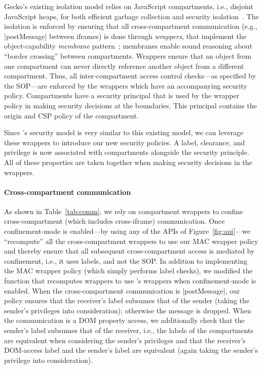 Gecko's existing isolation model relies on JavaScript compartments, i.e.,
disjoint JavaScript heaps, for both efficient garbage collection and
security isolation~\cite{wagner2011compartmental}.
%
The isolation is enforced by ensuring that all cross-compartment
communication (e.g., \js|postMessage| between iframes) is done through
\emph{wrappers}, that implement the object-capability \emph{membrane}
pattern~\cite{miller2003paradigm,miller2006robust}; membranes enable
sound reasoning about ``border crossing'' between compartments. 
%
Wrappers ensure that an object from one compartment can
never directly reference another object from a different compartment.
%
Thus, all inter-compartment access control checks---as specified by
the SOP---are enforced by the wrappers which have an accompanying
security policy.
%
Compartments have a security
principal that is used by the wrapper policy in making security
decisions at the boundaries.
%
This principal contains the origin and CSP policy of the compartment.

Since \sys{}'s security model is very similar to this existing
model, we can leverage these wrappers to introduce our new
security policies.
%
A label, clearance, and privilege is now associated with compartments
alongside the security principle.
%
All of these properties are taken together when making security decisions
in the wrappers.

\paragraph{Cross-compartment communication}
%
As shown in Table~\ref{tab:comm}, we rely on compartment wrappers to
confine cross-compartment (which includes cross-iframe) communication.
%
Once confinement-mode is enabled---by using any of the APIs of
Figure~\ref{fig:api}---we ``recompute'' all the cross-compartment
wrappers to use our MAC wrapper policy and thereby ensure that all
subsequent cross-compartment access is mediated by confinement, i.e.,
it uses labels, and not the SOP\@.
%
In addition to implementing the MAC wrapper policy (which simply
performs label checks), we modified the function that recomputes
wrappers to use \sys{}'s wrappers when confinement-mode is enabled.
%
When the cross-compartment communication is \js|postMessage|, our
policy ensures that the receiver's label subsumes that of the sender
(taking the sender's privileges into consideration); otherwise the
message is dropped.
%
When the communication is a DOM property access, we additionally check
that the sender's label subsumes that of the receiver, i.e., the labels of
the compartments are equivalent when considering the sender's
privileges and that the receiver's DOM-access label and the sender's
label are equivalent (again taking the sender's privilege into
consideration).

